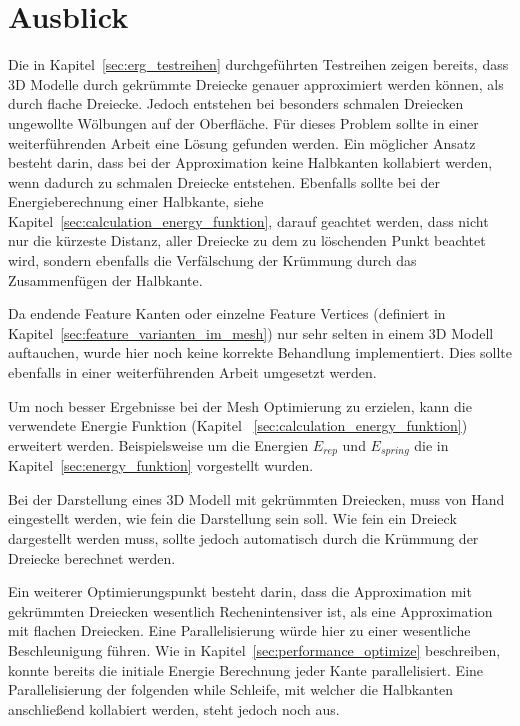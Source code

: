 \chapter{Ausblick}

Die in Kapitel~\ref{sec:erg_testreihen} durchgeführten Testreihen zeigen bereits, dass 3D Modelle durch ge\-krümm\-te Dreiecke genauer approximiert werden können, als durch flache Dreiecke.
Jedoch entstehen bei besonders schmalen Dreiecken ungewollte Wölbungen auf der Oberfläche.
Für dieses Problem sollte in einer weiterführenden Arbeit eine Lösung gefunden werden.
Ein möglicher Ansatz besteht darin, dass bei der Approximation keine Halbkanten kollabiert werden, wenn dadurch zu schmalen Dreiecke entstehen. 
Ebenfalls sollte bei der Energieberechnung einer Halbkante, siehe Kapitel~\ref{sec:calculation_energy_funktion}, darauf geachtet werden, dass nicht nur die kürzeste Distanz, aller Dreiecke zu dem zu löschenden Punkt beachtet wird, sondern ebenfalls die Verfälschung der Krümmung durch das Zusammenfügen der Halbkante.


\vspace*{0.3cm}

Da endende Feature Kanten oder einzelne Feature Vertices (definiert in Kapitel~\ref{sec:feature_varianten_im_mesh}) nur sehr selten in einem 3D Modell auftauchen, wurde hier noch keine korrekte Behandlung implementiert. Dies sollte ebenfalls in einer weiterführenden Arbeit umgesetzt werden.

\vspace*{0.3cm}

Um noch besser Ergebnisse bei der Mesh Optimierung zu erzielen, kann die verwendete Energie Funktion (Kapitel ~\ref{sec:calculation_energy_funktion}) erweitert werden. Beispielsweise um die Energien $E_{rep}$ und $E_{spring}$ die in Kapitel~\ref{sec:energy_funktion} vorgestellt wurden.

\vspace*{0.3cm}

Bei der Darstellung eines 3D Modell mit gekrümmten Dreiecken, muss von Hand eingestellt werden, wie fein die Darstellung sein soll. Wie fein ein Dreieck dargestellt werden muss, sollte jedoch automatisch durch die Krümmung der Dreiecke berechnet werden.

\vspace*{0.3cm}

Ein weiterer Optimierungspunkt besteht darin, dass die Approximation mit gekrümmten Dreiecken wesentlich Rechenintensiver ist, als eine Approximation mit flachen Dreiecken. Eine Parallelisierung würde hier zu einer wesentliche Beschleunigung führen. Wie in Kapitel~\ref{sec:performance_optimize} beschreiben, konnte bereits die initiale Energie Berechnung jeder Kante parallelisiert.
Eine Parallelisierung der folgenden while Schleife, mit welcher die Halbkanten anschließend kollabiert werden, steht jedoch noch aus. 


